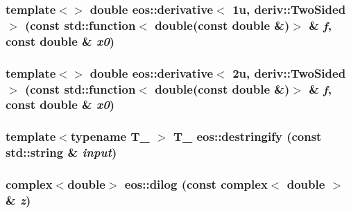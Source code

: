\label{namespaceeos_af951dd2b07bb6381c7529bc0558a629a}
\hypertarget{namespaceeos_ab2af1ce0d7308e92a859714806a6d4f0}{
\subsubsection[{derivative$<$ 1u, deriv::TwoSided $>$}]{\setlength{\rightskip}{0pt plus 5cm}template$<$$>$ double eos::derivative$<$ 1u, deriv::TwoSided $>$ (const std::function$<$ double(const double \&)$>$ \& {\em f}, \/  const double \& {\em x0})}}
\label{namespaceeos_ab2af1ce0d7308e92a859714806a6d4f0}
\hypertarget{namespaceeos_ab2d67e5e2a1c2f809d76dcfc4ec7f99a}{
\subsubsection[{derivative$<$ 2u, deriv::TwoSided $>$}]{\setlength{\rightskip}{0pt plus 5cm}template$<$$>$ double eos::derivative$<$ 2u, deriv::TwoSided $>$ (const std::function$<$ double(const double \&)$>$ \& {\em f}, \/  const double \& {\em x0})}}
\label{namespaceeos_ab2d67e5e2a1c2f809d76dcfc4ec7f99a}
\hypertarget{namespaceeos_ad3134beb65a048a00ed3607d0af90202}{
\subsubsection[{destringify}]{\setlength{\rightskip}{0pt plus 5cm}template$<$typename T\_\- $>$ T\_\- eos::destringify (const std::string \& {\em input})}}
\label{namespaceeos_ad3134beb65a048a00ed3607d0af90202}
\hypertarget{namespaceeos_a7fb80dc36d6e29adfbde318a197ea591}{
\subsubsection[{dilog}]{\setlength{\rightskip}{0pt plus 5cm}complex$<$double$>$ eos::dilog (const complex$<$ double $>$ \& {\em z})}}
